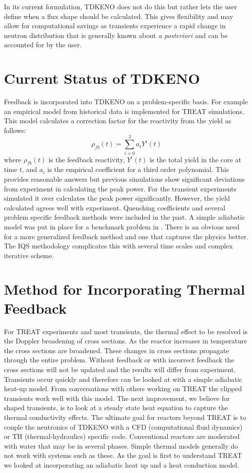 \documentclass[11pt]{article}
\begin{document}
 In its current formulation, TDKENO does not do this but rather lets the user define when a flux shape should be calculated.  This gives flexibility and may allow for computational savings as transients experience a rapid change in neutron distribution that is generally known about \emph{a posteriori} and can be accounted for by the user. 

\section{Current Status of TDKENO}
Feedback is incorporated into TDKENO on a problem-specific basis.  For example an empirical model from historical data is implemented for TREAT simulations. This model calculates a correction factor for the reactivity from the yield as follows:
\begin{equation}
    \rho_{fb}(t) = \sum_{i = 0}^{3}a_i Y^i (t)
\end{equation}
where $\rho_{fb}(t)$ is the feedback reactivity, $Y^i (t)$ is the total yield in the core at time $t$, and $a_i$ is the empirical coefficient for a third order polynomial.
  This provides reasonable answers but previous simulations show significant deviations from experiment in calculating the peak power.  For the transient experiments simulated it over calculates the peak power significantly.  However, the yield calculated agrees well with experiment.
Quenching coefficients and several problem specific feedback methods were included in the past.  A simple adiabatic model was put in place for a benchmark problem in \cite{Bentley}.  There is an obvious need for a more generalized feedback method and one that captures the physics better.  The IQS methodology complicates this with several time scales and complex iterative scheme.  

\section{Method for Incorporating Thermal Feedback}

For TREAT experiments and most transients, the thermal effect to be resolved is the Doppler broadening of cross sections.  As the reactor increases in temperature the cross sections are broadened.  These changes in cross sections propagate through the entire problem.  Without feedback or with incorrect feedback the cross sections will not be updated and the results will differ from experiment.  Transients occur quickly and therefore can be looked at with a simple  adiabatic heat-up model.  From conversations with others working on TREAT the clipped transients work well with this model.  The next improvement, we believe for shaped transients, is to look at a steady state heat equation to capture the thermal conductivity effects.  The ultimate goal for reactors beyond TREAT is to couple the neutronics of TDKENO with a CFD (computational fluid dynamics) or TH (thermal-hydraulics) specific code.  Conventional reactors are moderated with water that may be in several phases.  Simple thermal models generally do not work with systems such as these.  As the goal is first to understand TREAT we looked at incorporating an adiabatic heat up  and a heat conduction model.
\end{document}
